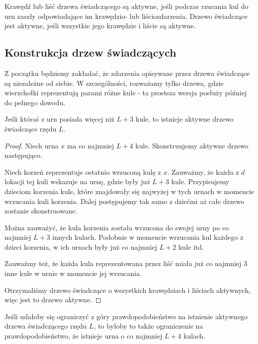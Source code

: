 \begin{definition}
	Krawędź lub liść drzewa świadczącego są aktywne, jeśli podczas rzucania kul do urn zaszły odpowiadające im krawędzio- lub liściozdarzenia.
	Drzewo świadczące jest aktywne, jeśli wszystkie jego krawędzie i liście są aktywne.
\end{definition}

\subsection*{Konstrukcja drzew świadczących}

Z początku będziemy zakładać, że zdarzenia opisywane przez drzewa świadczące są niezależne od siebie.
W szczególności, rozważamy tylko drzewa, gdzie wierzchołki reprezentują parami różne kule - ta prostsza wersja posłuży później do pełnego dowodu.

\begin{lemma}
	Jeśli któraś z urn posiada więcej niż \(L+3\) kule, to istnieje aktywne drzewo świadczące rzędu \(L\).
\end{lemma}
\begin{proof}
	Niech urna \(x\) ma co najmniej \(L+4\) kule. Skonstruujemy aktywne drzewo następująco.

	Niech korzeń reprezentuje ostatnio wrzuconą kulę z \(x\). Zauważmy, że każda z \(d\) lokacji tej kuli wskazuje na urnę, gdzie były już \(L+3\) kule.
	Przypisujemy dzieciom korzenia kule, które znajdowały się najwyżej w tych urnach w momencie wrzucania kuli korzenia. Dalej postępujemy tak samo z dziećmi aż całe drzewo zostanie skonstruowane.

	Można zauważyć, że kula korzenia została wrzucona do swojej urny po co najmniej \(L+3\) innych kulach. Podobnie w momencie wrzucania kul każdego z dzieci korzenia, w ich urnach były już co najmniej \(L+2\) kule itd.

	Zauważmy też, że każda kula reprezentowana przez liść miała już co najmniej 3 inne kule w urnie w momencie jej wrzucania.

	Otrzymaliśmy drzewo świadczące o wszystkich krawędziach i liściach aktywnych, więc jest to drzewo aktywne.
\end{proof}

Jeśli udałoby się ograniczyć z góry prawdopodobieństwo na istnienie aktywnego drzewa świadczącego rzędu \(L\), to byłoby to także ograniczenie na prawdopodobieństwo, że istnieje urna o co najmniej \(L+4\) kulach.

